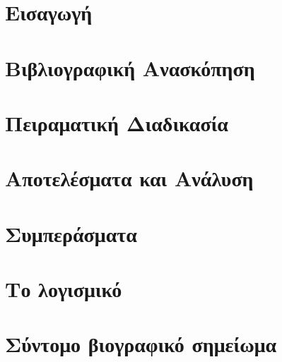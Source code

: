 \documentclass[11pt]{report}
\begin{document}








\setcounter{page}{1}

\tableofcontents


\chapter{Εισαγωγή}


\chapter{Βιβλιογραφική Ανασκόπηση}


\chapter{Πειραματική Διαδικασία}


\chapter{Αποτελέσματα και Ανάλυση}


\chapter{Συμπεράσματα}




\appendix
\chapter{Το λογισμικό}

\chapter{Σύντομο βιογραφικό σημείωμα}

\end{document}
